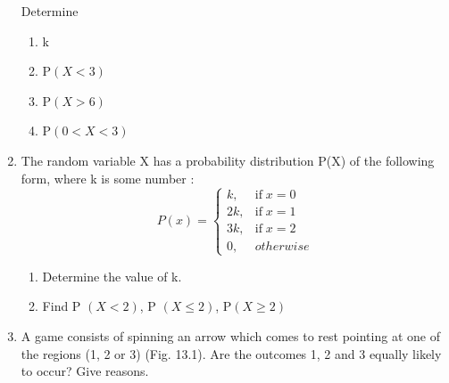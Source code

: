 \begin{enumerate}[label=\thesection.\arabic*,ref=\thesection.\theenumi]
Determine

\begin{enumerate}
\begin{table}[ht!]\centering

\end{table}
\item k
\item P$(X < 3)$
\item P$(X > 6)$
\item P$(0 < X < 3)$

\end{enumerate}

\item The random variable X has a probability distribution P(X) of the following form,
where k is some number :
\[P(x)=\begin{cases}
k, & \mbox{if}\; x= 0\\
2k, & \mbox{if}\; x= 1\\
3k, & \mbox{if}\; x= 2\\
0, & otherwise
\end{cases}\]
\begin{enumerate}
\item Determine the value of k.
\item Find P $(X < 2)$, P $(X \leq 2)$, P$(X \geq 2)$
\end{enumerate}
\item
A game consists of spinning an arrow which comes to rest pointing at one of the regions (1, 2 or 3) (Fig. 13.1). Are the outcomes 1, 2 and 3 equally likely to occur? Give reasons.\\
\begin{figure}[!ht]
	\begin{center}
		

\end{center}
\end{figure}
\end{enumerate}
